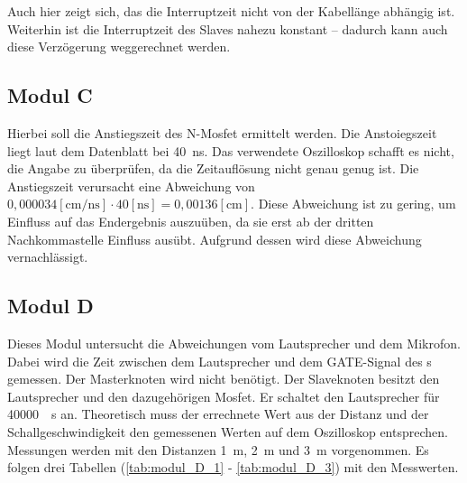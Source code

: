 Auch hier zeigt sich, das die Interruptzeit nicht von der Kabellänge abhängig ist. Weiterhin ist die Interruptzeit des Slaves nahezu konstant -- dadurch kann auch diese Verzögerung weggerechnet werden. 

\subsection{Modul C}
Hierbei soll die Anstiegszeit des N-Mosfet ermittelt werden. Die Anstoiegszeit liegt laut dem Datenblatt bei \SI{40}{\nano\s}. Das verwendete Oszilloskop schafft es nicht, die Angabe zu überprüfen, da die Zeitauflösung nicht genau genug ist. Die Anstiegszeit verursacht eine Abweichung von $\si{0,000034}[\si{\centi\m\per\nano\s}] \cdot \si{40} [\si{\nano\s}] = \si{0,00136} [\si{\centi\m}]$. Diese Abweichung ist zu gering, um Einfluss auf das Endergebnis auszuüben, da sie erst ab der dritten Nachkommastelle Einfluss ausübt. Aufgrund dessen wird diese Abweichung vernachlässigt.

\subsection{Modul D}
\label{sec:modul_D}
Dieses Modul untersucht die Abweichungen vom Lautsprecher und dem Mikrofon. Dabei wird die Zeit zwischen dem Lautsprecher und dem \si{GATE}-Signal des \microphone s \platz gemessen. Der Masterknoten wird nicht benötigt. Der Slaveknoten besitzt den Lautsprecher und den dazugehörigen Mosfet. Er schaltet den Lautsprecher für \SI{40000}{\mu\s} an. Theoretisch muss der errechnete Wert aus der Distanz und der Schallgeschwindigkeit den gemessenen Werten auf dem Oszilloskop entsprechen. Messungen werden mit den Distanzen \SI{1}{m}, \SI{2}{m} und \SI{3}{m} vorgenommen. Es folgen drei Tabellen (\ref{tab:modul_D_1} - \ref{tab:modul_D_3}) mit den Messwerten. 

